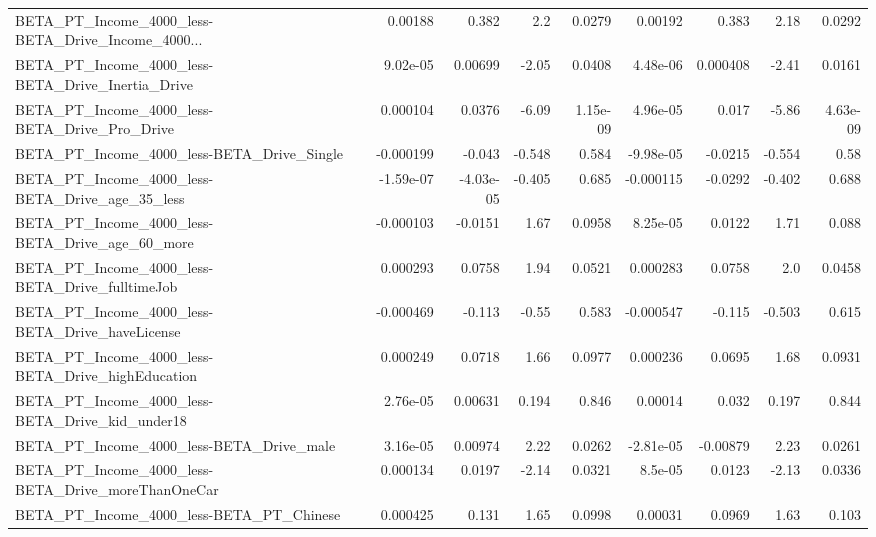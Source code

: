 \begin{tabular}{lrrrrrrrr}
BETA\_PT\_Income\_4000\_less-BETA\_Drive\_Income\_4000... &     0.00188 &        0.382 &      2.2 &   0.0279 &    0.00192 &       0.383 &         2.18 &        0.0292 \\
BETA\_PT\_Income\_4000\_less-BETA\_Drive\_Inertia\_Drive  &    9.02e-05 &      0.00699 &    -2.05 &   0.0408 &   4.48e-06 &    0.000408 &        -2.41 &        0.0161 \\
BETA\_PT\_Income\_4000\_less-BETA\_Drive\_Pro\_Drive      &    0.000104 &       0.0376 &    -6.09 & 1.15e-09 &   4.96e-05 &       0.017 &        -5.86 &      4.63e-09 \\
BETA\_PT\_Income\_4000\_less-BETA\_Drive\_Single         &   -0.000199 &       -0.043 &   -0.548 &    0.584 &  -9.98e-05 &     -0.0215 &       -0.554 &          0.58 \\
BETA\_PT\_Income\_4000\_less-BETA\_Drive\_age\_35\_less    &   -1.59e-07 &    -4.03e-05 &   -0.405 &    0.685 &  -0.000115 &     -0.0292 &       -0.402 &         0.688 \\
BETA\_PT\_Income\_4000\_less-BETA\_Drive\_age\_60\_more    &   -0.000103 &      -0.0151 &     1.67 &   0.0958 &   8.25e-05 &      0.0122 &         1.71 &         0.088 \\
BETA\_PT\_Income\_4000\_less-BETA\_Drive\_fulltimeJob    &    0.000293 &       0.0758 &     1.94 &   0.0521 &   0.000283 &      0.0758 &          2.0 &        0.0458 \\
BETA\_PT\_Income\_4000\_less-BETA\_Drive\_haveLicense    &   -0.000469 &       -0.113 &    -0.55 &    0.583 &  -0.000547 &      -0.115 &       -0.503 &         0.615 \\
BETA\_PT\_Income\_4000\_less-BETA\_Drive\_highEducation  &    0.000249 &       0.0718 &     1.66 &   0.0977 &   0.000236 &      0.0695 &         1.68 &        0.0931 \\
BETA\_PT\_Income\_4000\_less-BETA\_Drive\_kid\_under18    &    2.76e-05 &      0.00631 &    0.194 &    0.846 &    0.00014 &       0.032 &        0.197 &         0.844 \\
BETA\_PT\_Income\_4000\_less-BETA\_Drive\_male           &    3.16e-05 &      0.00974 &     2.22 &   0.0262 &  -2.81e-05 &    -0.00879 &         2.23 &        0.0261 \\
BETA\_PT\_Income\_4000\_less-BETA\_Drive\_moreThanOneCar &    0.000134 &       0.0197 &    -2.14 &   0.0321 &    8.5e-05 &      0.0123 &        -2.13 &        0.0336 \\
BETA\_PT\_Income\_4000\_less-BETA\_PT\_Chinese           &    0.000425 &        0.131 &     1.65 &   0.0998 &    0.00031 &      0.0969 &         1.63 &         0.103 \\

\end{tabular}
